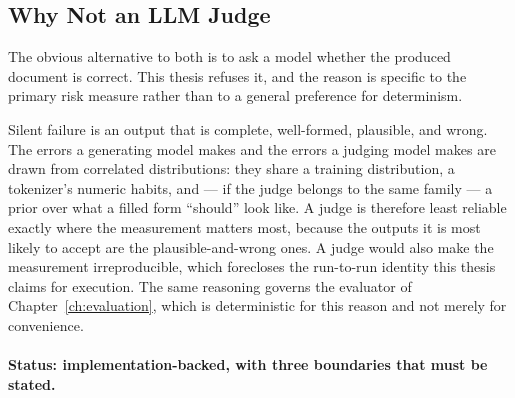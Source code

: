 \subsection{Why Not an LLM Judge}
\label{sec:der:oracles:judge}

The obvious alternative to both is to ask a model whether the produced document is correct. This
thesis refuses it, and the reason is specific to the primary risk measure rather than to a general
preference for determinism.

Silent failure is an output that is complete, well-formed, plausible, and wrong. The errors a
generating model makes and the errors a judging model makes are drawn from correlated distributions:
they share a training distribution, a tokenizer's numeric habits, and --- if the judge belongs to the
same family --- a prior over what a filled form ``should'' look like. A judge is therefore least
reliable exactly where the measurement matters most, because the outputs it is most likely to accept
are the plausible-and-wrong ones. A judge would also make the measurement irreproducible, which
forecloses the run-to-run identity this thesis claims for execution. The same reasoning governs the
evaluator of Chapter~\ref{ch:evaluation}, which is deterministic for this reason and not merely for
convenience.

\paragraph{Status: implementation-backed, with three boundaries that must be stated.}

